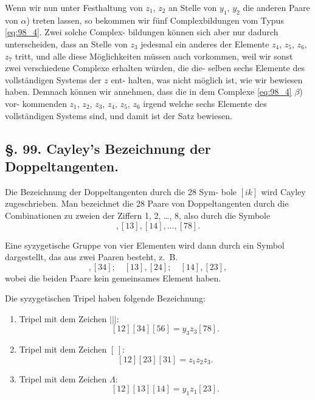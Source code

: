 \documentclass[12pt,a4paper]{article}
\theoremstyle{plain}
\theoremstyle{definition}
\theoremstyle{remark}
\begin{document}
Wenn wir nun unter Festhaltung von $z_1$, $z_2$ an Stelle von
$y_1$, $y_2$ die anderen Paare von $\alpha$) treten lassen, so bekommen
wir fünf Complexbildungen vom Typus \eqref{eq:98_4}. Zwei solche Complex-
bildungen können sich aber nur dadurch unterscheiden, dass an
Stelle von $z_3$ jedesmal ein anderes der Elemente $z_4$, $z_5$, $z_6$, $z_7$
tritt, und alle diese Möglichkeiten müssen auch vorkommen, weil
wir sonst zwei verschiedene Complexe erhalten würden, die die-
selben sechs Elemente des vollständigen Systems der $z$ ent-
halten, was nicht möglich ist, wie wir bewiesen haben. Demnach
können wir annehmen, dass die in dem Complexe \eqref{eq:98_4} $\beta$) vor-
kommenden $z_1$, $z_2$, $z_3$, $z_4$, $z_5$, $z_6$ irgend welche sechs Elemente
des vollständigen Systems sind, und damit ist der Satz bewiesen.

\subsection*{§. 99. Cayley's Bezeichnung der Doppeltangenten.}

Die Bezeichnung der Doppeltangenten durch die 28 Sym-
bole $[ik]$ wird Cayley zugeschrieben. Man bezeichnet die 28
Paare von Doppeltangenten durch die Combinationen zu zweien
der Ziffern 1, 2, \ldots, 8, also durch die Symbole
\begin{equation*}
[12], [13], [14], \ldots, [78].
\end{equation*}

Eine syzygetische Gruppe von vier Elementen wird dann
durch ein Symbol dargestellt, das aus zwei Paaren besteht, z.~B.
\begin{equation*}
[12], [34]; \quad [13], [24]; \quad [14], [23],
\end{equation*}
wobei die beiden Paare kein gemeinsames Element haben.

Die syzygetischen Tripel haben folgende Bezeichnung:

\begin{enumerate}[label=\arabic*.]
\item Tripel mit dem Zeichen $|\!|\!|$:
\begin{equation*}\label{eq:99_1}
[12][34][56] = y_3 z_3 [78].
\end{equation*}

\item Tripel mit dem Zeichen $[\,]$:
\begin{equation*}\label{eq:99_2}
[12][23][31] = z_1 z_2 z_3.
\end{equation*}

\item Tripel mit dem Zeichen $\Lambda$:
\begin{equation*}\label{eq:99_3}
[12][13][14] = y_1 z_1 [23].
\end{equation*}
\end{enumerate}
\end{document}
